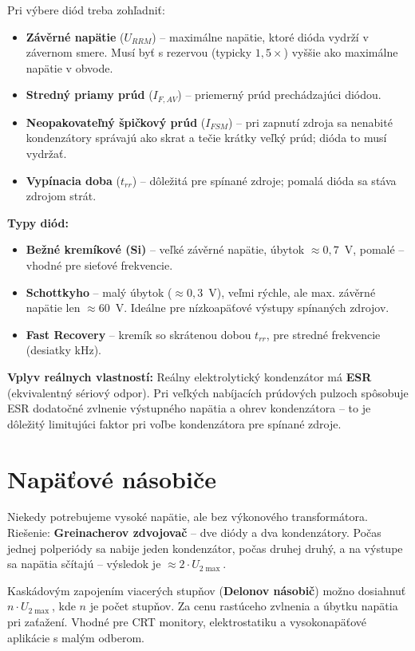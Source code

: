 Pri výbere diód treba zohľadniť:
\begin{itemize}
    \item \textbf{Závěrné napätie} ($U_{RRM}$) -- maximálne napätie, ktoré dióda vydrží v závernom smere. Musí byť s rezervou (typicky $1{,}5\times$) vyššie ako maximálne napätie v obvode.
    \item \textbf{Stredný priamy prúd} ($I_{F,AV}$) -- priemerný prúd prechádzajúci diódou.
    \item \textbf{Neopakovateľný špičkový prúd} ($I_{FSM}$) -- pri zapnutí zdroja sa nenabité kondenzátory správajú ako skrat a tečie krátky veľký prúd; dióda to musí vydržať.
    \item \textbf{Vypínacia doba} ($t_{rr}$) -- dôležitá pre spínané zdroje; pomalá dióda sa stáva zdrojom strát.
\end{itemize}

\textbf{Typy diód:}
\begin{itemize}
    \item \textbf{Bežné kremíkové (Si)} -- veľké závěrné napätie, úbytok $\approx 0{,}7$~V, pomalé -- vhodné pre sieťové frekvencie.
    \item \textbf{Schottkyho} -- malý úbytok ($\approx 0{,}3$~V), veľmi rýchle, ale max. závěrné napätie len $\approx 60$~V. Ideálne pre nízkoapäťové výstupy spínaných zdrojov.
    \item \textbf{Fast Recovery} -- kremík so skrátenou dobou $t_{rr}$, pre stredné frekvencie (desiatky kHz).
\end{itemize}

\textbf{Vplyv reálnych vlastností:} Reálny elektrolytický kondenzátor má \textbf{ESR} (ekvivalentný sériový odpor). Pri veľkých nabíjacích prúdových pulzoch spôsobuje ESR dodatočné zvlnenie výstupného napätia a ohrev kondenzátora -- to je dôležitý limitujúci faktor pri voľbe kondenzátora pre spínané zdroje.

\section{Napäťové násobiče}

Niekedy potrebujeme vysoké napätie, ale bez výkonového transformátora. Riešenie: \textbf{Greinacherov zdvojovač} -- dve diódy a dva kondenzátory. Počas jednej polperiódy sa nabije jeden kondenzátor, počas druhej druhý, a na výstupe sa napätia sčítajú -- výsledok je $\approx 2 \cdot U_{2\max}$.

Kaskádovým zapojením viacerých stupňov (\textbf{Delonov násobič}) možno dosiahnuť $n \cdot U_{2\max}$, kde $n$ je počet stupňov. Za cenu rastúceho zvlnenia a úbytku napätia pri zaťažení. Vhodné pre CRT monitory, elektrostatiku a vysokonapäťové aplikácie s malým odberom.

